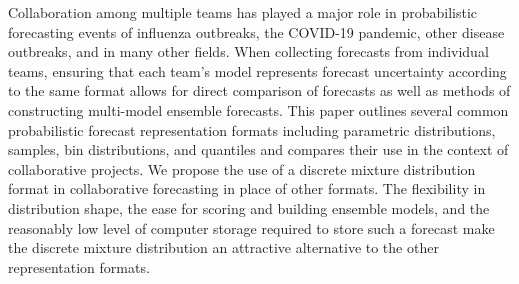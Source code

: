 
Collaboration among multiple teams has played a major role in probabilistic
forecasting events of influenza outbreaks, the COVID-19 pandemic, other disease
outbreaks, and in many other fields. When collecting forecasts from 
individual teams, ensuring that each team's model represents forecast
uncertainty according to the same format allows for direct comparison of 
forecasts as well as methods of constructing multi-model ensemble forecasts.
This paper outlines several common probabilistic forecast representation formats 
including
parametric distributions, samples, bin distributions, and  quantiles 
and compares
their use in the context of collaborative projects. We propose the use of
a discrete mixture distribution format in collaborative forecasting in place of
other formats. The flexibility in distribution shape, the ease for scoring and 
building ensemble models, and the reasonably low level of computer storage 
required to store such a forecast make the discrete mixture distribution an 
attractive alternative to the other representation formats.

